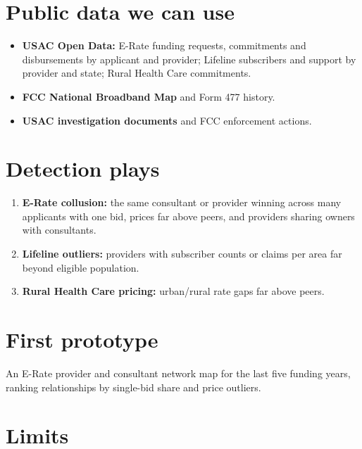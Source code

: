\documentclass[letterpaper,11pt]{article}
\providecommand{\tightlist}{\setlength{\itemsep}{0pt}\setlength{\parskip}{0pt}}
\begin{document}
\hypertarget{public-data-we-can-use}{%
\section{Public data we can use}\label{public-data-we-can-use}}

\begin{itemize}
\tightlist
\item
  \textbf{USAC Open Data:} E-Rate funding requests, commitments and
  disbursements by applicant and provider; Lifeline subscribers and
  support by provider and state; Rural Health Care commitments.
\item
  \textbf{FCC National Broadband Map} and Form 477 history.
\item
  \textbf{USAC investigation documents} and FCC enforcement actions.
\end{itemize}

\hypertarget{detection-plays}{%
\section{Detection plays}\label{detection-plays}}

\begin{enumerate}
\def\labelenumi{\arabic{enumi}.}
\tightlist
\item
  \textbf{E-Rate collusion:} the same consultant or provider winning
  across many applicants with one bid, prices far above peers, and
  providers sharing owners with consultants.
\item
  \textbf{Lifeline outliers:} providers with subscriber counts or claims
  per area far beyond eligible population.
\item
  \textbf{Rural Health Care pricing:} urban/rural rate gaps far above
  peers.
\end{enumerate}

\hypertarget{first-prototype}{%
\section{First prototype}\label{first-prototype}}

An E-Rate provider and consultant network map for the last five funding
years, ranking relationships by single-bid share and price outliers.

\hypertarget{limits}{%
\section{Limits}\label{limits}}
\end{document}
